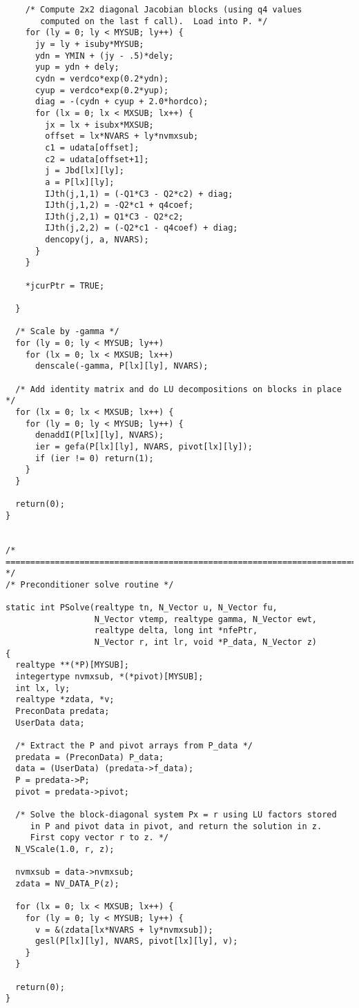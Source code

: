 \begin{verbatim}
    /* Compute 2x2 diagonal Jacobian blocks (using q4 values 
       computed on the last f call).  Load into P. */
    for (ly = 0; ly < MYSUB; ly++) {
      jy = ly + isuby*MYSUB;
      ydn = YMIN + (jy - .5)*dely;
      yup = ydn + dely;
      cydn = verdco*exp(0.2*ydn);
      cyup = verdco*exp(0.2*yup);
      diag = -(cydn + cyup + 2.0*hordco);
      for (lx = 0; lx < MXSUB; lx++) {
        jx = lx + isubx*MXSUB;
        offset = lx*NVARS + ly*nvmxsub;
        c1 = udata[offset];
        c2 = udata[offset+1];
        j = Jbd[lx][ly];
        a = P[lx][ly];
        IJth(j,1,1) = (-Q1*C3 - Q2*c2) + diag;
        IJth(j,1,2) = -Q2*c1 + q4coef;
        IJth(j,2,1) = Q1*C3 - Q2*c2;
        IJth(j,2,2) = (-Q2*c1 - q4coef) + diag;
        dencopy(j, a, NVARS);
      }
    }
    
    *jcurPtr = TRUE;

  }

  /* Scale by -gamma */
  for (ly = 0; ly < MYSUB; ly++)
    for (lx = 0; lx < MXSUB; lx++)
      denscale(-gamma, P[lx][ly], NVARS);
  
  /* Add identity matrix and do LU decompositions on blocks in place */
  for (lx = 0; lx < MXSUB; lx++) {
    for (ly = 0; ly < MYSUB; ly++) {
      denaddI(P[lx][ly], NVARS);
      ier = gefa(P[lx][ly], NVARS, pivot[lx][ly]);
      if (ier != 0) return(1);
    }
  }
  
  return(0);
}


/* ======================================================================= */
/* Preconditioner solve routine */

static int PSolve(realtype tn, N_Vector u, N_Vector fu, 
                  N_Vector vtemp, realtype gamma, N_Vector ewt, 
                  realtype delta, long int *nfePtr,
                  N_Vector r, int lr, void *P_data, N_Vector z)
{
  realtype **(*P)[MYSUB];
  integertype nvmxsub, *(*pivot)[MYSUB];
  int lx, ly;
  realtype *zdata, *v;
  PreconData predata;
  UserData data;

  /* Extract the P and pivot arrays from P_data */
  predata = (PreconData) P_data;
  data = (UserData) (predata->f_data);
  P = predata->P;
  pivot = predata->pivot;

  /* Solve the block-diagonal system Px = r using LU factors stored
     in P and pivot data in pivot, and return the solution in z.
     First copy vector r to z. */
  N_VScale(1.0, r, z);

  nvmxsub = data->nvmxsub;
  zdata = NV_DATA_P(z);

  for (lx = 0; lx < MXSUB; lx++) {
    for (ly = 0; ly < MYSUB; ly++) {
      v = &(zdata[lx*NVARS + ly*nvmxsub]);
      gesl(P[lx][ly], NVARS, pivot[lx][ly], v);
    }
  }

  return(0);
}
\end{verbatim}